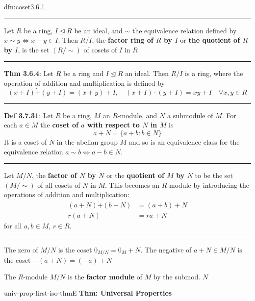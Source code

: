 \documentclass[landscape, 8pt]{extarticle}
\begin{document}
\begin{multicols}{3}
\begin{dfn}[Coset]{dfn:coset}{3.6.1}
    \noindent\rule{\textwidth}{0.2pt}
    Let $R$ be a ring, $I \unlhd R$ be an ideal, and $\sim$ the equivalence relation defined by $x \sim y \iff x - y \in I$. Then $R / I$, the \textbf{factor ring of $R$ by $I$} or \textbf{the quotient of $R$ by $I$}, is the set $(R / \sim)$ of cosets of $I$ in $R$

    \noindent\rule{\textwidth}{0.2pt}
    \textbf{Thm 3.6.4}: Let $R$ be a ring and $I \unlhd R$ an ideal. Then $R / I$ is a ring, where the operation of addition and multiplication is defined by
    \[(x + I) \dot{+} (y + I) = (x + y) + I, \quad (x + I) \cdot (y + I) = xy + I \quad \forall x,y\in R\]

    \vspace{-5pt}
    \noindent\rule{\textwidth}{0.6pt}

    \textbf{Def 3.7.31}: Let $R$ be a ring, $M$ an $R$-module, and $N$ a submodule of $M$. For each $a\in M$ the \textbf{coset of $a$ with respect to $N$ in $M$} is
    \[a + N = \{ a + b : b\in N\}\]
    It is a coset of $N$ in the abelian group $M$ and so is an equivalence class for the equivalence relation $a \sim b \iff a - b \in N$.

    \vspace{-5pt}
    \noindent\rule{\textwidth}{0.2pt}
    Let $M / N$, the \textbf{factor of $N$ by $N$} or the \textbf{quotient of $M$ by $N$} to be the set $(M / \sim)$ of all cosets of $N$ in $M$. This becomes an $R$-module by introducing the operations of addition and multiplication:
    \begin{align*}
        (a + N) \dot{+} (b + N) &= (a + b) + N\\
        r(a + N) &= ra + N
    \end{align*}
    for all $a,b\in M$, $r\in R$.

    \vspace{-5pt}
    \noindent\rule{\textwidth}{0.2pt}
    The zero of $M / N$ is the coset $0_{M /N} = 0_{M} + N$. The negative of $a + N\in M / N$ is the coset $-(a + N) = (-a) + N$

    The $R$-module $M / N$ is the \textbf{factor module} of $M$ by the submod. $N$
\end{dfn}

\vspace{-5pt}
\begin{thm}{univ-prop-first-iso-thm}{E}
    \vspace{-5pt}
    \textbf{Thm: Universal Properties}


\end{thm}
\end{multicols}
\end{document}
